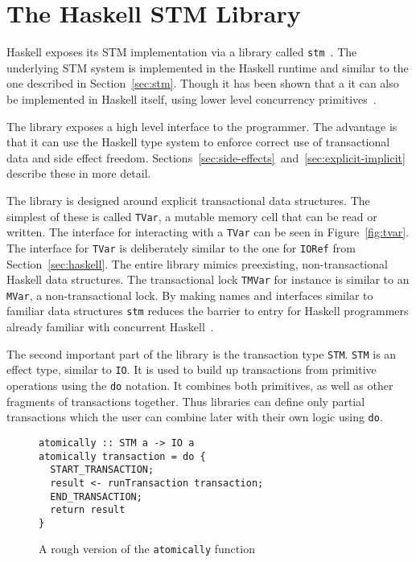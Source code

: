 \section{The Haskell STM Library}

\label{sec:library}

Haskell exposes its STM implementation via a library called
\texttt{stm}~\cite{composable-transactions}. The underlying STM system is
implemented in the Haskell runtime and similar to the one described in
Section~\ref{sec:stm}. Though it has been shown that a it can also be
implemented in Haskell itself, using lower level concurrency
primitives~\cite{stm-in-concurrent-haskell,concurrent-haskell}.

The library exposes a high level interface to the
programmer. The advantage is that it can use the Haskell type system to enforce
correct use of transactional data and side effect freedom.
Sections~\ref{sec:side-effects}~and~\ref{sec:explicit-implicit} describe these
in more detail.

The library is designed around explicit transactional data structures. The
simplest of these is called \texttt{TVar}, a mutable memory cell that can be
read or written. The interface for interacting with a \texttt{TVar} can be seen
in Figure~\ref{fig:tvar}. The interface for \texttt{TVar} is deliberately
similar to the one for \texttt{IORef} from Section~\ref{sec:haskell}. The entire
library mimics preexisting, non-transactional Haskell data structures. The
transactional lock \texttt{TMVar} for instance is similar to an \texttt{MVar}, a
non-transactional lock. By making names and interfaces similar to
familiar data structures \texttt{stm} reduces the barrier to entry for Haskell
programmers already familiar with concurrent Haskell~\cite{concurrent-haskell}.

The second important part of the library is the transaction type \texttt{STM}.
\texttt{STM} is an effect type, similar to \texttt{IO}. It is used to build up
transactions from primitive operations using the \texttt{do} notation. It
combines both primitives, as well as other fragments of transactions together.
Thus libraries can define only partial transactions which the user can combine
later with their own logic using \texttt{do}.

\begin{figure}
  \begin{lstlisting}
atomically :: STM a -> IO a
atomically transaction = do {
  START_TRANSACTION;
  result <- runTransaction transaction;
  END_TRANSACTION;
  return result
}
  \end{lstlisting}
  \caption{A rough version of the \texttt{atomically} function}
  \label{fig:atomically}
\end{figure}

